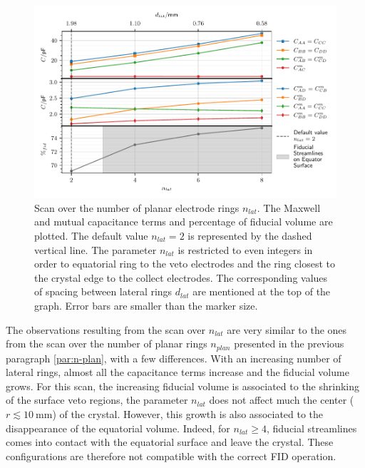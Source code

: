 \begin{figure}
\centering
\includegraphics[scale=1]{Figures/ElectrodesScan/capacitance_fiducial_n_lat.pdf}
\caption{Scan over the number of planar electrode rings $n_{lat}$. The Maxwell and mutual capacitance terms and percentage of fiducial volume are plotted. The default value $n_{lat}=2$ is represented by the dashed vertical line. The parameter $n_{lat}$ is restricted to even integers in order to equatorial ring to the veto electrodes and the ring closest to the crystal edge to the collect electrodes. The corresponding values of spacing between lateral rings $d_{lat}$ are mentioned at the top of the graph. Error bars are smaller than the marker size.}
\label{fig:capacitance-fiducial-n-lat}
\end{figure}

The observations resulting from the scan over $n_{lat}$ are very similar to the ones from the scan over the number of planar rings $n_{plan}$ presented in the previous paragraph \ref{par:n-plan}, with a few differences. With an increasing number of lateral rings, almost all the capacitance terms increase and the fiducial volume grows.
For this scan, the increasing fiducial volume is associated to the shrinking of the surface veto regions, the parameter $n_{lat}$ does not affect much the center ($r\lesssim\SI{10}{\mm}$) of the crystal. However, this growth is also associated to the disappearance of the equatorial volume. Indeed, for $n_{lat} \geq 4$, fiducial streamlines comes into contact with the equatorial surface and leave the crystal. These configurations are therefore not compatible with the correct FID operation.

